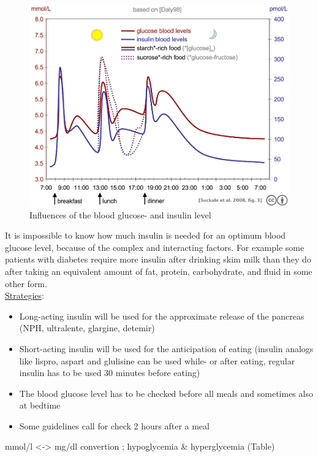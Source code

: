 \begin{figure}[htb]
\centering
\includegraphics[width=\textwidth]{images/Suckale08_fig3_glucose_insulin_day.jpg}
\caption{Influences of the blood glucose- and insulin level}
\end{figure}
It is impossible to know how much insulin is needed for an optimum blood glucose level, because of the complex and 
interacting factors. For example some patients with diabetes require more insulin after drinking skim milk than 
they do after taking an equivalent amount of fat, protein, carbohydrate, and fluid in some other form.\\
\newpage
\underline{Strategies}:\\
\begin{itemize}
  \item Long-acting insulin will be used for the approximate release of the pancreas (NPH, ultralente, glargine, detemir)
  \item Short-acting insulin will be used for the anticipation of eating (insulin analogs like lispro, aspart and 
	  glulisine can be used while- or after eating, regular insulin has to be used 30 minutes before eating)
  \item The blood glucose level has to be checked before all meals and sometimes also at bedtime
  \item Some guidelines call for check 2 hours after a meal
\end{itemize}
mmol/l <-> mg/dl convertion ; hypoglycemia \& hyperglycemia (Table)\\
